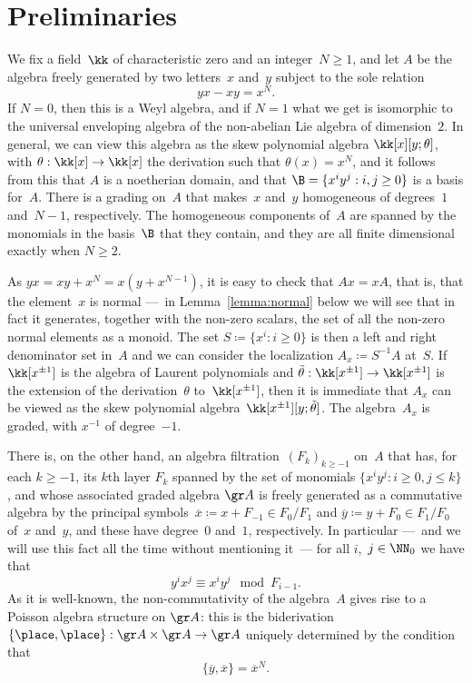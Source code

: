 \section{Preliminaries}

We fix a field~$\kk$ of characteristic zero and an integer~$N\geq1$, and let $A$
be the algebra freely generated by two letters~$x$ and~$y$ subject to the
sole relation
  \[
  yx-xy = x^N.
  \]
If $N=0$, then this is a Weyl algebra, and if $N=1$ what we get is
isomorphic to the universal enveloping algebra of the non-abelian Lie
algebra of dimension~$2$. In general, we can view this algebra as the skew
polynomial algebra $\kk[x][y;\theta]$, with $\theta:\kk[x]\to\kk[x]$ the
derivation such that $\theta(x)=x^N$, and it follows from this that $A$ is
a noetherian domain, and that $\B=\{x^iy^j:i,j\geq0\}$ is a basis for~$A$.
There is a grading on~$A$ that makes~$x$ and~$y$ homogeneous of degrees~$1$
and~$N-1$, respectively. The homogeneous components of~$A$ are spanned by
the monomials in the basis~$\B$ that they contain, and they are all finite
dimensional exactly when $N\geq2$.

As $yx=xy+x^N=x(y+x^{N-1})$, it is easy to check that $Ax=xA$, that is,
that the element~$x$ is normal ---~in Lemma~\ref{lemma:normal} below we
will see that in fact it generates, together with the non-zero scalars, the
set of all the non-zero normal elements as a monoid. The set $S\coloneqq
\{x^i:i\geq0\}$ is then a left and right denominator set in~$A$ and we can
consider the localization $A_x\coloneqq S^{-1}A$ at~$S$. If $\kk[x^{\pm1}]$
is the algebra of Laurent polynomials and
$\tilde\theta:\kk[x^{\pm1}]\to\kk[x^{\pm1}]$ is the extension of the
derivation~$\theta$ to~$\kk[x^{\pm1}]$, then it is immediate that $A_x$ can
be viewed as the skew polynomial algebra~$\kk[x^{\pm1}][y;\tilde\theta]$.
The algebra~$A_x$ is graded, with $x^{-1}$ of degree~$-1$.

There is, on the other hand, an algebra filtration~$(F_k)_{k\geq-1}$ on~$A$
that has, for each $k\geq-1$, its $k$th layer $F_k$ spanned by the set of monomials
$\{x^iy^j:i\geq0,j\leq k\}$, and whose associated graded algebra $\gr A$ is
freely generated as a commutative algebra by the principal
symbols~$\overline x\coloneqq x+F_{-1}\in F_0/F_1$ and $\overline
y\coloneqq y+F_{0}\in F_1/F_0$  of~$x$ and~$y$, and these have degree~$0$
and~$1$, respectively. In particular ---~and we will use this fact all the
time without mentioning it~--- for all $i$,~$j\in\NN_0$ we have that
  \[
  y^ix^j \equiv x^iy^j \mod F_{i-1}.
  \]
As it is well-known, the non-commutativity of the algebra~$A$ gives rise to
a Poisson algebra structure on $\gr A$: this is the
biderivation~$\{\place,\place\}:\gr A\times\gr A\to\gr A$ uniquely
determined by the condition that
  \[
  \{\overline y,\overline x\} = \overline x^N.
  \]

